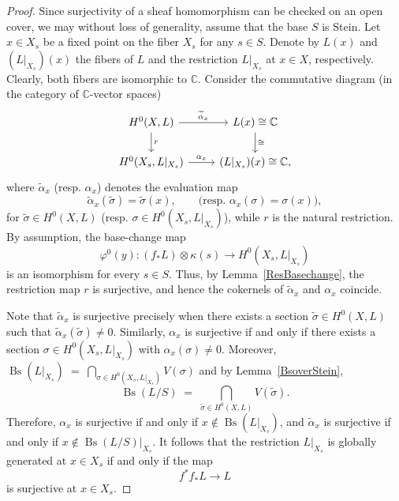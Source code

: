\documentclass[12pt]{amsart}
\numberwithin{equation}{section}
\theoremstyle{definition}
\theoremstyle{plain}
\newtheorem*{thm A*}{Theorem A}
\newtheorem*{thm B*}{Theorem B}
\newtheorem*{thm C*}{Theorem C}
\newtheorem*{thm D*}{Theorem D}
\theoremstyle{definition}
\renewcommand{\1}{\mathds{1}}
\renewcommand{\>}{\rightarrow}
\begin{document}
\begin{proof}
Since surjectivity of a sheaf homomorphism can be checked on an open cover, we may without loss of generality, assume that the base $S$ is Stein. Let $x\in X_s$ be a fixed point on the fiber $X_s$ for any $s\in S$. 
Denote by $L(x)$ and $(L|_{X_s})(x)$ the fibers of $L$ and the restriction $L|_{X_s}$ at $x \in X$, respectively. Clearly, both fibers are isomorphic to $\mathbb{C}$. 
Consider the commutative diagram (in the category of $\mathbb{C}$-vector spaces)
\[
\begin{tikzcd}
H^0(X, L)  \arrow[r, "\widetilde{\alpha}_x"] \arrow[d,"r"] & L(x) \cong \mathbb{C} \arrow[d,"\cong"] \\
H^0(X_s, L|_{X_s})  \arrow[r, "{\alpha}_x"] & {(L|_{X_s})}(x) \cong \mathbb{C},
\end{tikzcd}
\]
where $\widetilde{\alpha}_x$ (resp. ${\alpha}_x$) denotes the evaluation map 
\[
\widetilde{\alpha}_x (\widetilde{\sigma}) = \widetilde{\sigma}(x), \qquad \text{(resp. ${\alpha}_x (\sigma) = \sigma(x)$)},
\]
for $\widetilde{\sigma} \in H^0(X,L)$ (resp. $\sigma\in H^0(X_s,L|_{X_s})$), while $r$ is the natural restriction. 
By assumption, the base-change map 
\[
\varphi^0(y): (f_*L)\otimes \kappa(s) \longrightarrow H^0(X_s, L|_{X_s})
\]
is an isomorphism for every $s \in S$. Thus, by Lemma~\ref{ResBasechange}, the restriction map $r$ is surjective, and hence the cokernels of $\widetilde{\alpha}_x$ and ${\alpha}_x$ coincide.  

Note that $\widetilde{\alpha}_x$ is surjective precisely when there exists a section $\widetilde{\sigma} \in H^0(X,L)$ such that $\widetilde{\alpha}_x(\widetilde{\sigma}) \neq 0$. Similarly, ${\alpha}_x$ is surjective if and only if there exists a section $\sigma \in H^0(X_s, L|_{X_s})$ with ${\alpha}_x(\sigma) \neq 0$.
Moreover, 
$\operatorname{Bs}(L|_{X_s}) \;=\; \bigcap_{\sigma\in H^0(X_s, L|_{X_s})} V(\sigma)$ and by Lemma~\ref{BsoverStein},  
$$\operatorname{Bs}(L/S) \;=\; \bigcap_{\widetilde{\sigma}\in H^0(X,L)} V(\tilde{\sigma}).
$$
Therefore, ${\alpha}_x$ is surjective if and only if $x \notin \operatorname{Bs}(L|_{X_s})$, and $\widetilde{\alpha}_x$ is surjective if and only if $x \notin \operatorname{Bs}(L/S)|_{X_s}$. It follows that the restriction $L|_{X_s}$ is globally generated at $x \in X_s$ if and only if the map 
\[
f^*f_*L \longrightarrow L
\]
is surjective at $x \in X_s$.
\end{proof}
\end{document}
